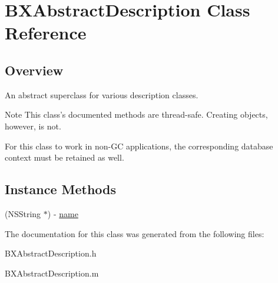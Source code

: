 \hypertarget{interface_b_x_abstract_description}{}\section{B\+X\+Abstract\+Description Class Reference}
\label{interface_b_x_abstract_description}


\subsection{Overview}
An abstract superclass for various description classes. 

\begin{DoxyNote}{Note}
This class's documented methods are thread-\/safe. Creating objects, however, is not. 

For this class to work in non-\/\+G\+C applications, the corresponding database context must be retained as well. 
\end{DoxyNote}
\subsection*{Instance Methods}
\begin{DoxyCompactItemize}
\item 
\hypertarget{interface_b_x_abstract_description_aa71e1031743fd50054b420da87987a58}{}(N\+S\+String $\ast$) -\/ \hyperlink{interface_b_x_abstract_description_aa71e1031743fd50054b420da87987a58}{name}\label{interface_b_x_abstract_description_aa71e1031743fd50054b420da87987a58}

\end{DoxyCompactItemize}


The documentation for this class was generated from the following files\+:\begin{DoxyCompactItemize}
\item 
B\+X\+Abstract\+Description.\+h\item 
B\+X\+Abstract\+Description.\+m\end{DoxyCompactItemize}
